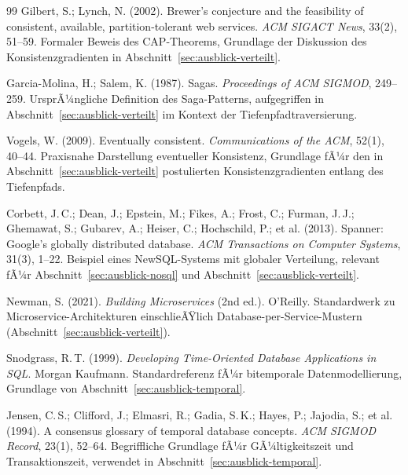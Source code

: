 ﻿\documentclass[a4paper,12pt]{report}
\theoremstyle{definition}
\theoremstyle{remark}
\begin{document}
\begin{thebibliography}{99}
Gilbert, S.; Lynch, N. (2002).
\newblock Brewer's conjecture and the feasibility of consistent, available,
partition-tolerant web services.
\newblock \emph{ACM SIGACT News}, 33(2), 51--59.
\newblock Formaler Beweis des CAP-Theorems, Grundlage der Diskussion
des Konsistenzgradienten in Abschnitt~\ref{sec:ausblick-verteilt}.

Garcia-Molina, H.; Salem, K. (1987).
\newblock Sagas.
\newblock \emph{Proceedings of ACM SIGMOD}, 249--259.
\newblock UrsprÃ¼ngliche Definition des Saga-Patterns, aufgegriffen in
Abschnitt~\ref{sec:ausblick-verteilt} im Kontext der
Tiefenpfadtraversierung.

Vogels, W. (2009).
\newblock Eventually consistent.
\newblock \emph{Communications of the ACM}, 52(1), 40--44.
\newblock Praxisnahe Darstellung eventueller Konsistenz, Grundlage
fÃ¼r den in Abschnitt~\ref{sec:ausblick-verteilt} postulierten
Konsistenzgradienten entlang des Tiefenpfads.

Corbett, J.\,C.; Dean, J.; Epstein, M.; Fikes, A.; Frost, C.;
Furman, J.\,J.; Ghemawat, S.; Gubarev, A.; Heiser, C.; Hochschild, P.;
et al. (2013).
\newblock Spanner: Google's globally distributed database.
\newblock \emph{ACM Transactions on Computer Systems}, 31(3), 1--22.
\newblock Beispiel eines NewSQL-Systems mit globaler Verteilung,
relevant fÃ¼r Abschnitt~\ref{sec:ausblick-nosql} und
Abschnitt~\ref{sec:ausblick-verteilt}.

Newman, S. (2021).
\newblock \emph{Building Microservices} (2nd ed.).
\newblock O'Reilly.
\newblock Standardwerk zu Microservice-Architekturen einschlieÃŸlich
Database-per-Service-Mustern (Abschnitt~\ref{sec:ausblick-verteilt}).


Snodgrass, R.\,T. (1999).
\newblock \emph{Developing Time-Oriented Database Applications in SQL}.
\newblock Morgan Kaufmann.
\newblock Standardreferenz fÃ¼r bitemporale Datenmodellierung,
Grundlage von Abschnitt~\ref{sec:ausblick-temporal}.

Jensen, C.\,S.; Clifford, J.; Elmasri, R.; Gadia, S.\,K.; Hayes, P.;
Jajodia, S.; et al. (1994).
\newblock A consensus glossary of temporal database concepts.
\newblock \emph{ACM SIGMOD Record}, 23(1), 52--64.
\newblock Begriffliche Grundlage fÃ¼r GÃ¼ltigkeitszeit und
Transaktionszeit, verwendet in Abschnitt~\ref{sec:ausblick-temporal}.


\end{thebibliography}
\end{document}
